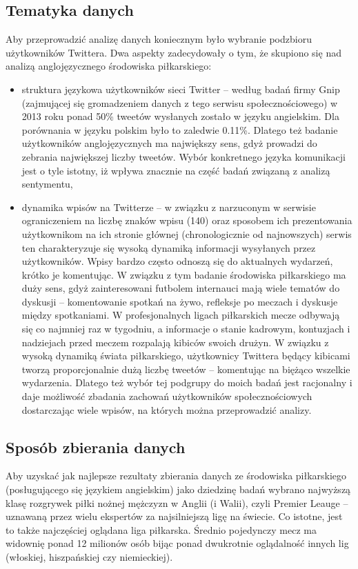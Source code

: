 \subsection{Tematyka danych}
Aby przeprowadzić analizę danych koniecznym było wybranie podzbioru
użytkowników Twittera. Dwa aspekty zadecydowały o tym, że skupiono się nad
analizą anglojęzycznego środowiska piłkarskiego:
\begin{itemize}   
  \item struktura językowa użytkowników sieci Twitter -- według badań firmy Gnip
  \cite{GnipTwitterLanguages} (zajmującej się gromadzeniem danych z tego serwisu
  społecznościowego) w 2013 roku ponad 50\% tweetów wysłanych zostało w języku
  angielskim.
  Dla porównania w języku polskim było to zaledwie 0.11\%.
  Dlatego też badanie użytkowników anglojęzycznych ma największy sens, gdyż
  prowadzi do zebrania największej liczby tweetów.
  Wybór konkretnego języka komunikacji jest o tyle istotny, iż wpływa znacznie
  na część badań związaną z analizą sentymentu,
  \item dynamika wpisów na Twitterze -- w związku z narzuconym w serwisie
  ograniczeniem na liczbę znaków wpisu (140) oraz sposobem ich prezentowania
  użytkownikom na ich stronie głównej (chronologicznie od najnowszych) serwis
  ten charakteryzuje się wysoką dynamiką informacji wysyłanych przez użytkowników.
  Wpisy bardzo często odnoszą się do aktualnych wydarzeń, krótko je komentując.
  W związku z tym badanie środowiska piłkarskiego ma duży sens, gdyż zainteresowani
  futbolem internauci mają wiele tematów do dyskusji -- komentowanie spotkań na żywo,
  refleksje po meczach i dyskusje między spotkaniami.
  W profesjonalnych ligach piłkarskich mecze odbywają się co najmniej raz w tygodniu,
  a informacje o stanie kadrowym, kontuzjach i nadziejach przed meczem
  rozpalają kibiców swoich drużyn. W związku z wysoką dynamiką świata piłkarskiego,
  użytkownicy Twittera będący kibicami tworzą proporcjonalnie dużą liczbę
  tweetów -- komentując na biężąco wszelkie wydarzenia. Dlatego też wybór
  tej podgrupy do moich badań jest racjonalny i daje możliwość zbadania 
  zachowań użytkowników społecznościowych dostarczając wiele wpisów, na których
  można przeprowadzić analizy.
\end{itemize}  


\subsection{Sposób zbierania danych}
Aby uzyskać jak najlepsze rezultaty zbierania danych ze środowiska piłkarskiego
(posługującego się językiem angielskim) jako dziedzinę badań wybrano
najwyższą klasę rozgrywek piłki nożnej mężczyzn w Anglii (i Walii),
czyli Premier Leauge -- uznawaną przez wielu ekspertów za najsilniejszą ligę na
świecie. Co istotne, jest to także najczęściej oglądana liga piłkarska.
Średnio pojedynczy mecz ma widownię ponad 12 milionów osób
\cite{PremierLeagueAudience} bijąc ponad dwukrotnie oglądalność innych lig 
(włoskiej, hiszpańskiej czy niemieckiej).

